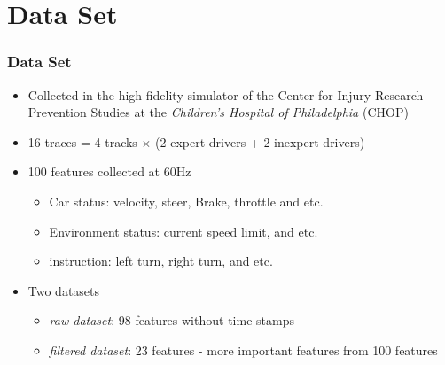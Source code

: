 \documentclass{beamer}
\begin{document}
\section{Data Set}
\begin{frame}
\frametitle{Data Set}
\begin{itemize}
\item Collected in the high-fidelity simulator of the Center for Injury Research Prevention Studies at the \textit{Children's Hospital of Philadelphia} (CHOP)
\item 16 traces = 4 tracks $\times$ (2 expert drivers + 2 inexpert drivers)
\item 100 features collected at 60Hz
	\begin{itemize}
	\item Car status: velocity, steer, Brake, throttle and etc.
	\item Environment status: current speed limit, and etc.
	\item instruction: left turn, right turn, and etc.
	\end{itemize}
\item Two datasets
	\begin{itemize}
	\item {\em raw dataset}: 98 features without time stamps
	\item {\em filtered dataset}: 23 features - more important features from 100 features
	\end{itemize}
\end{itemize}

\end{frame}
\end{document}
